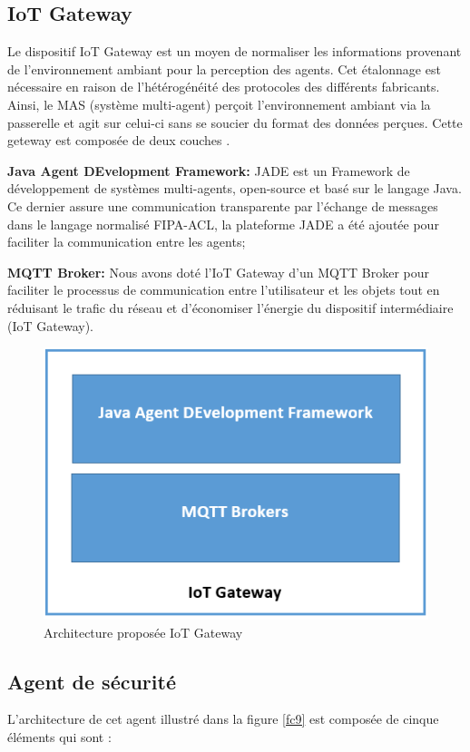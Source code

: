 \subsection{IoT Gateway}
Le dispositif IoT Gateway est un moyen de normaliser les informations provenant de l'environnement ambiant pour la perception des agents. Cet étalonnage est nécessaire en raison de l'hétérogénéité des protocoles des différents fabricants. Ainsi, le MAS (système multi-agent) perçoit l'environnement ambiant via la passerelle et agit sur celui-ci sans se soucier du format des données perçues. Cette geteway est composée de deux couches \cite{zouai2019ambiance}.


\textbf{Java Agent DEvelopment Framework:} JADE est un Framework de développement de systèmes multi-agents, open-source et basé sur le langage Java. Ce dernier assure une communication transparente par l’échange de messages dans le langage normalisé FIPA-ACL, la plateforme JADE  a été ajoutée pour faciliter la communication entre les agents;


\textbf{MQTT Broker:} Nous avons doté l'IoT  Gateway d'un MQTT Broker pour faciliter le processus de communication entre l'utilisateur et les objets tout en réduisant le trafic du réseau et d'économiser l'énergie du dispositif intermédiaire (IoT Gateway).
\begin{figure}[H]
\centering
\includegraphics[scale=0.8]{chap1/fc8.png}
\caption{Architecture proposée IoT Gateway}
\label{fc8}
\end{figure}

\subsection{Agent de sécurité}
L’architecture de cet agent illustré dans la figure \ref{fc9} est composée de cinque éléments qui sont \cite{zouai2017iot} : 

